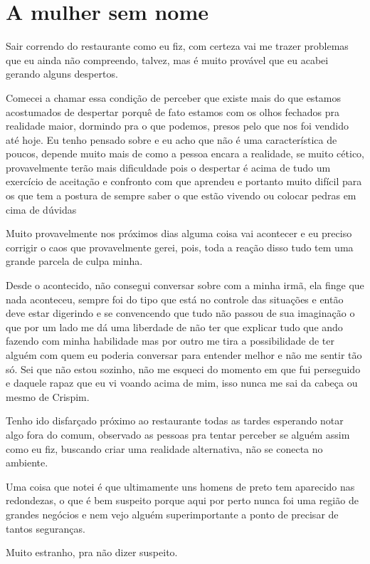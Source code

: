 \chapter{A mulher sem nome}
Sair correndo do restaurante como eu fiz, com certeza vai me trazer problemas que eu ainda não compreendo, talvez, mas é muito provável que eu acabei gerando alguns despertos. 

Comecei a chamar essa condição de perceber que existe mais do que estamos acostumados de despertar porquê de fato estamos com os olhos fechados pra realidade maior, dormindo pra o que podemos, presos pelo que nos foi vendido até hoje. Eu tenho pensado sobre e eu acho que não é uma característica de poucos, depende muito mais de como a pessoa encara a realidade, se muito cético, provavelmente terão mais dificuldade pois o despertar é acima de tudo um exercício de aceitação e confronto com que aprendeu e portanto muito difícil para os que tem a postura de sempre saber o que estão vivendo ou colocar pedras em cima de dúvidas

Muito provavelmente nos próximos dias alguma coisa vai acontecer e eu preciso corrigir o caos que provavelmente gerei, pois, toda a reação disso tudo tem uma grande parcela de culpa minha.

Desde o acontecido, não consegui conversar sobre com a minha irmã, ela finge que nada aconteceu, sempre foi do tipo que está no controle das situações e então deve estar digerindo e se convencendo que tudo não passou de sua imaginação o que por um lado me dá uma liberdade de não ter que explicar tudo que ando fazendo com minha habilidade mas por outro me tira a possibilidade de ter alguém com quem eu poderia conversar para entender melhor e não me sentir tão só. Sei que não estou sozinho, não me esqueci do momento em que fui perseguido e daquele rapaz que eu vi voando acima de mim, isso nunca me sai da cabeça ou mesmo de Crispim.

Tenho ido disfarçado próximo ao restaurante todas as tardes esperando notar algo fora do comum, observado as pessoas pra tentar perceber se alguém assim como eu fiz, buscando criar uma realidade alternativa, não se conecta no ambiente.

Uma coisa que notei é que ultimamente uns homens de preto tem aparecido nas redondezas, o que é bem suspeito porque aqui por perto nunca foi uma região de grandes negócios e nem vejo alguém superimportante a ponto de precisar de tantos seguranças.  

Muito estranho, pra não dizer suspeito.

